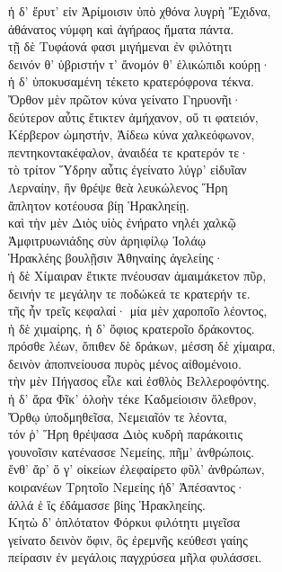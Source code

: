 \begin{pages}
\begin{Leftside}
\quad{}ἡ δ' ἔρυτ' εἰν Ἀρίμοισιν ὑπὸ χθόνα λυγρὴ Ἔχιδνα, \\
ἀθάνατος νύμφη καὶ ἀγήραος ἤματα πάντα. \\
τῇ δὲ Τυφάονά φασι μιγήμεναι ἐν φιλότητι\\
δεινόν θ' ὑβριστήν τ' ἄνομόν θ' ἑλικώπιδι κούρῃ· \\
ἡ δ' ὑποκυσαμένη τέκετο κρατερόφρονα τέκνα.\\
Ὄρθον μὲν πρῶτον κύνα γείνατο Γηρυονῆι· \\
δεύτερον αὖτις ἔτικτεν ἀμήχανον, οὔ τι φατειόν,  \\
Κέρβερον ὠμηστήν, Ἀίδεω κύνα χαλκεόφωνον,\\
πεντηκοντακέφαλον, ἀναιδέα τε κρατερόν τε· \\
τὸ τρίτον Ὕδρην αὖτις ἐγείνατο λύγρ' εἰδυῖαν \\
Λερναίην, ἣν θρέψε θεὰ λευκώλενος Ἥρη\\
ἄπλητον κοτέουσα βίῃ Ἡρακληείῃ. \\
καὶ τὴν μὲν Διὸς υἱὸς ἐνήρατο νηλέι χαλκῷ\\
Ἀμφιτρυωνιάδης σὺν ἀρηιφίλῳ Ἰολάῳ\\
Ἡρακλέης βουλῇσιν Ἀθηναίης ἀγελείης·\\
ἡ δὲ Χίμαιραν ἔτικτε πνέουσαν ἀμαιμάκετον πῦρ,\\
δεινήν τε μεγάλην τε ποδώκεά τε κρατερήν τε.  \\
τῆς ἦν τρεῖς κεφαλαί· μία μὲν χαροποῖο λέοντος,\\
ἡ δὲ χιμαίρης, ἡ δ' ὄφιος κρατεροῖο δράκοντος.\\
πρόσθε λέων, ὄπιθεν δὲ δράκων, μέσση δὲ χίμαιρα,\\
δεινὸν ἀποπνείουσα πυρὸς μένος αἰθομένοιο.\\
τὴν μὲν Πήγασος εἷλε καὶ ἐσθλὸς Βελλεροφόντης. \\
ἡ δ' ἄρα Φῖκ' ὀλοὴν τέκε Καδμείοισιν ὄλεθρον,\\
Ὄρθῳ ὑποδμηθεῖσα, Νεμειαῖόν τε λέοντα, \\
τόν ῥ' Ἥρη θρέψασα Διὸς κυδρὴ παράκοιτις\\
γουνοῖσιν κατένασσε Νεμείης, πῆμ' ἀνθρώποις.\\
ἔνθ' ἄρ' ὅ γ' οἰκείων ἐλεφαίρετο φῦλ' ἀνθρώπων, \\
κοιρανέων Τρητοῖο Νεμείης ἠδ' Ἀπέσαντος· \\
ἀλλά ἑ ἲς ἐδάμασσε βίης Ἡρακληείης.\\

\quad{}Κητὼ δ' ὁπλότατον Φόρκυι φιλότητι μιγεῖσα\\
γείνατο δεινὸν ὄφιν, ὃς ἐρεμνῆς κεύθεσι γαίης\\
πείρασιν ἐν μεγάλοις παγχρύσεα μῆλα φυλάσσει. \\


\end{Leftside}
\end{pages}
